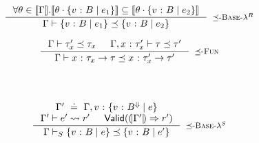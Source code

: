 \hfill{}\\

$$
\inference{
        \forall \sub\in\interp{\env}.
        \interp{\applysub{\sub}{\tref{v}{\btyp}{\refa_1}}}
        \subseteq
        \interp{\applysub{\sub}{\tref{v}{\btyp}{\refa_2}}}
}{
        \issubtype{\env}{\tref{v}{\btyp}{\refa_1}}{\tref{v}{\btyp}{\refa_2}}
}[\rsubbasecore]
$$

$$
\inference{
	\issubtype{\env}{\typ_x'}{\typ_x} &
	\issubtype{\env,\tbind{x}{\typ_x'}}{\typ}{\typ'}
}{
	\issubtype{\env}{\tfun{x}{\typ_x}{\typ}}{\tfun{x}{\typ_x'}{\typ'}}
}[\rsubfun]
$$\\[0.4in]

\hfill{}\\

$$
\inference{
\env' \defeq \env,\tbind{v}{\tref{v}{\btyp^\tlabel}{\refa}} \\
\tologicshort{\env'}{\refa'}{\tbool}{\pred'}{}{}{} &
\smtvalid{\vcond{\env'}{\pred'}}
}{
	\aissubtype{\env}{\tref{v}{\btyp}{\refa}}{\tref{v}{\btyp}{\refa'}}
}[\rsubbasesmt]
$$
